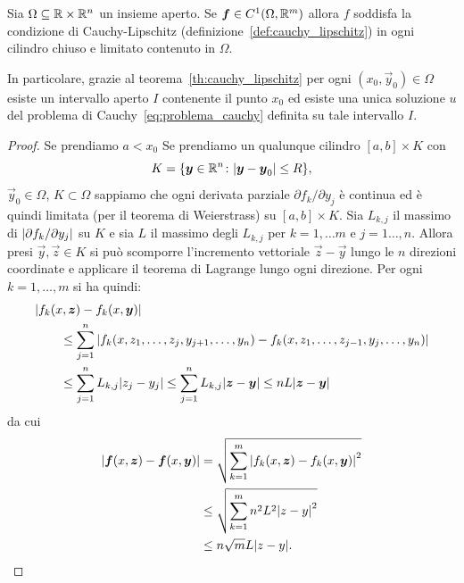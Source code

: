 \begin{proposition}%
\mymark{***}%
Sia $\Omega \subseteq {\mathbb R}\times {\mathbb R}^n$ un insieme aperto.
Se $\boldsymbol f\in C^1(\Omega,{\mathbb R}^m)$ 
allora $f$ soddisfa la condizione
di Cauchy-Lipschitz (definizione~\ref{def:cauchy_lipschitz})
in ogni cilindro chiuso e limitato contenuto in $\Omega$.

In particolare, grazie al teorema~\ref{th:cauchy_lipschitz} 
per ogni $(x_0,\vec y_0)\in \Omega$ esiste un intervallo aperto 
$I$ contenente il punto $x_0$
ed esiste una unica soluzione $u$ 
del problema di Cauchy~\eqref{eq:problema_cauchy} definita 
su tale intervallo $I$.
\end{proposition}
%
\begin{proof}
\mymark{***}%
Se prendiamo $a<x_0$ 
Se prendiamo un qualunque cilindro $[a,b]\times K$ con 
\[
  K={\left\{ \boldsymbol y\in {\mathbb R}^n\colon {\left|\boldsymbol y-\boldsymbol y_0\right|}\le R \right\}}, 
\]
$\vec y_0\in \Omega$, $K\subset \Omega$
sappiamo che ogni derivata parziale
$\partial f_k / \partial y_j$ è continua ed è quindi limitata
(per il teorema di Weierstrass) su $[a,b]\times K$. 
Sia $L_{k,j}$ il massimo di ${\left|\partial f_k / \partial y_j\right|}$ su $K$ e sia
$L$ il massimo degli $L_{k,j}$ per $k=1,\dots m$ e $j=1\dots,n$.
Allora presi $\vec y, \vec z\in K$ si può scomporre l'incremento vettoriale 
$\vec z - \vec y$ lungo le $n$ direzioni coordinate e applicare il teorema di Lagrange lungo ogni direzione.
Per ogni $k = 1,\dots, m$ si ha quindi:
\begin{align*}
\MoveEqLeft
\abs{f_k(x,\vec z)-f_k(x,\vec y)}\\
&\le \sum_{j=1}^n \abs{f_k(x,z_1, \dots, z_j, y_{j+1}, \dots, y_n) - f_k(x,z_1, \dots, z_{j-1}, y_j, \dots, y_n)}\\
&\le \sum_{j=1}^n L_{k,j} \abs{z_j-y_j}
\le \sum_{j=1}^n L_{k,j} \abs{\vec z-\vec y}
\le n L \abs{\vec z-\vec y}
\end{align*}
da cui
\begin{align*}
  {\left|\boldsymbol f(x,\boldsymbol z) - \boldsymbol f(x,\boldsymbol y)\right|}
  &= \sqrt{\sum_{k=1}^m {\left|f_k(x,\boldsymbol z) - f_k(x,\boldsymbol y)\right|}^2} \\
  &\le \sqrt{\sum_{k=1}^m n^2 L^2 {\left|z-y\right|}^2} \\
  &\le n\sqrt{m} L {\left|z-y\right|}.
\end{align*}
\end{proof}

